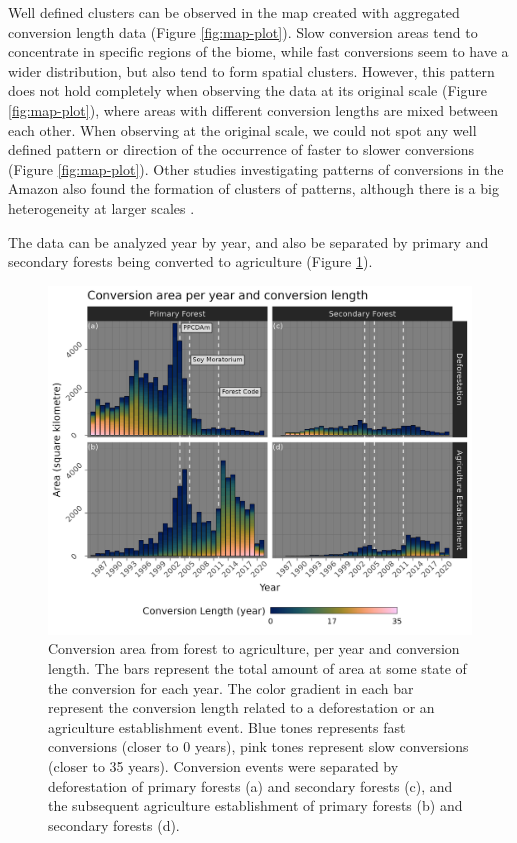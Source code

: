 \documentclass[essd, manuscript]{copernicus}
\begin{document}
Well defined clusters can be observed in the map created with aggregated conversion length data (Figure \ref{fig:map-plot}).
Slow conversion areas tend to concentrate in specific regions of the biome, while fast conversions seem to have a wider distribution, but also tend to form spatial clusters.
However, this pattern does not hold completely when observing the data at its original scale (Figure \ref{fig:map-plot}), where areas with different conversion lengths are mixed between each other.
When observing at the original scale, we could not spot any well defined pattern or direction of the occurrence of faster to slower conversions (Figure \ref{fig:map-plot}).
Other studies investigating patterns of conversions in the Amazon also found the formation of clusters of patterns, although there is a big heterogeneity at larger scales \citep{MullerHansen2017}.

The data can be analyzed year by year, and also be separated by primary and secondary forests being converted to agriculture (Figure \ref{fig:transbar-plot}).

\begin{figure}[h]
\includegraphics[width=17cm]{figs/c_length_cols} \caption{Conversion area from forest to agriculture, per year and conversion length. The bars represent the total amount of area at some state of the conversion for each year. The color gradient in each bar represent the conversion length related to a deforestation or an agriculture establishment event. Blue tones represents fast conversions (closer to 0 years), pink tones represent slow conversions (closer to 35 years). Conversion events were separated by deforestation of primary forests (a) and secondary forests (c), and the subsequent agriculture establishment of primary forests (b) and secondary forests (d).}\label{fig:transbar-plot}
\end{figure}
\end{document}
